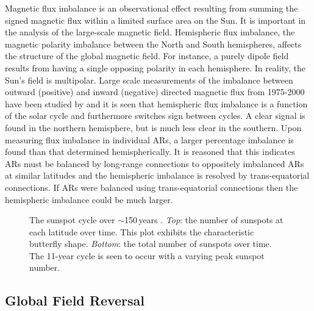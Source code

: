 Magnetic flux imbalance is an observational effect resulting from summing the signed magnetic flux within a limited surface area on the Sun. It is important in the analysis of the large-scale magnetic field. Hemispheric flux imbalance, the magnetic polarity imbalance between the North and South hemispheres, affects the structure of the global magnetic field. For instance, a purely dipole field results from having a single opposing polarity in each hemisphere. In reality, the Sun's field is multipolar.
Large scale measurements of the imbalance between outward (positive) and inward (negative) directed magnetic flux from 1975-2000 have been studied by \citet{Choudhary:2002} and it is seen that hemispheric flux imbalance is a function of the solar cycle and furthermore switches sign between cycles. A clear signal is found in the northern hemisphere, but is much less clear in the southern. Upon measuring flux imbalance in individual ARs, a larger percentage imbalance is found than that determined hemispherically. It is reasoned that this indicates ARs must be balanced by long-range connections to oppositely imbalanced ARs at similar latitudes and the hemispheric imbalance is resolved by trans-equatorial connections. If ARs were balanced using trans-equatorial connections then the hemispheric imbalance could be much larger.

\begin{landscape}
\begin{figure}
\caption[The sunspot cycle over $\sim$150\,years.]{The sunspot cycle over $\sim$150\,years \citep[from][]{Hathaway:2010b}. \emph{Top}: the number of sunspots at each latitude over time. This plot exhibits the characteristic butterfly shape. \emph{Bottom}: the total number of sunspots over time. The 11-year cycle is seen to occur with a varying peak sunspot number.}
\label{fig:sunspotnum}
\end{figure}
\end{landscape}

\subsection{Global Field Reversal}\label{intro:fieldreversal}

